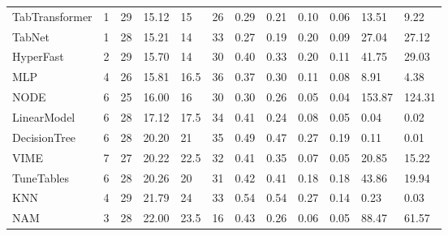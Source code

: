 \begin{tabular}{lllllrllllll}
TabTransformer & 1 & 29 & 15.12 & 15 & 26 & 0.29 & 0.21 & 0.10 & 0.06 & 13.51 & 9.22 \\
TabNet & 1 & 28 & 15.21 & 14 & 33 & 0.27 & 0.19 & 0.20 & 0.09 & 27.04 & 27.12 \\
HyperFast & 2 & 29 & 15.70 & 14 & 30 & 0.40 & 0.33 & 0.20 & 0.11 & 41.75 & 29.03 \\
MLP & 4 & 26 & 15.81 & 16.5 & 36 & 0.37 & 0.30 & 0.11 & 0.08 & 8.91 & 4.38 \\
NODE & 6 & 25 & 16.00 & 16 & 30 & 0.30 & 0.26 & 0.05 & 0.04 & 153.87 & 124.31 \\
LinearModel & 6 & 28 & 17.12 & 17.5 & 34 & 0.41 & 0.24 & 0.08 & 0.05 & 0.04 & 0.02 \\
DecisionTree & 6 & 28 & 20.20 & 21 & 35 & 0.49 & 0.47 & 0.27 & 0.19 & 0.11 & 0.01 \\
VIME & 7 & 27 & 20.22 & 22.5 & 32 & 0.41 & 0.35 & 0.07 & 0.05 & 20.85 & 15.22 \\
TuneTables & 6 & 28 & 20.26 & 20 & 31 & 0.42 & 0.41 & 0.18 & 0.18 & 43.86 & 19.94 \\
KNN & 4 & 29 & 21.79 & 24 & 33 & 0.54 & 0.54 & 0.27 & 0.14 & 0.23 & 0.03 \\
NAM & 3 & 28 & 22.00 & 23.5 & 16 & 0.43 & 0.26 & 0.06 & 0.05 & 88.47 & 61.57 \\
\bottomrule
\end{tabular}
